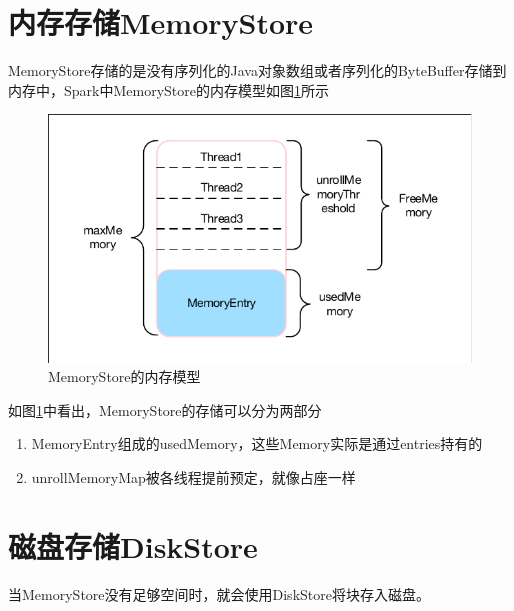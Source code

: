 \section{内存存储MemoryStore}
MemoryStore存储的是没有序列化的Java对象数组或者序列化的ByteBuffer存储到内存中，Spark中MemoryStore的内存模型如图\ref{fig:memoryStore}所示
\begin{figure}[H] 
	\centering
	\includegraphics[width=\textwidth]{figures/memoryStore.pdf}
	\caption{MemoryStore的内存模型}
	\label{fig:memoryStore}
\end{figure}

如图\ref{fig:memoryStore}中看出，MemoryStore的存储可以分为两部分
\begin{enumerate}[\bfseries 1]
	\item MemoryEntry组成的usedMemory，这些Memory实际是通过entries持有的
	\item unrollMemoryMap被各线程提前预定，就像占座一样
\end{enumerate}
\section{磁盘存储DiskStore}
当MemoryStore没有足够空间时，就会使用DiskStore将块存入磁盘。